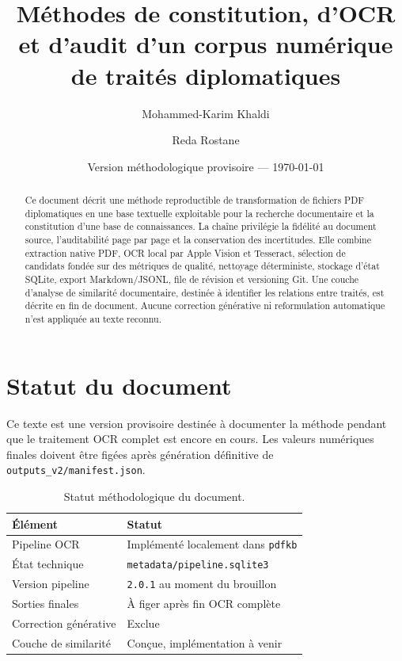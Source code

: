 \documentclass[11pt,a4paper]{article}
\title{Méthodes de constitution, d'OCR et d'audit d'un corpus numérique de traités diplomatiques}
\author{Mohammed-Karim Khaldi \and Reda Rostane}
\date{Version méthodologique provisoire --- \today}
\begin{document}
\maketitle

\begin{abstract}
Ce document décrit une méthode reproductible de transformation de fichiers PDF diplomatiques en une base textuelle exploitable pour la recherche documentaire et la constitution d'une base de connaissances. La chaîne privilégie la fidélité au document source, l'auditabilité page par page et la conservation des incertitudes. Elle combine extraction native PDF, OCR local par Apple Vision et Tesseract, sélection de candidats fondée sur des métriques de qualité, nettoyage déterministe, stockage d'état SQLite, export Markdown/JSONL, file de révision et versioning Git. Une couche d'analyse de similarité documentaire, destinée à identifier les relations entre traités, est décrite en fin de document. Aucune correction générative ni reformulation automatique n'est appliquée au texte reconnu.
\end{abstract}

\tableofcontents

\section{Statut du document}

Ce texte est une version provisoire destinée à documenter la méthode pendant que le traitement OCR complet est encore en cours. Les valeurs numériques finales doivent être figées après génération définitive de \texttt{outputs\_v2/manifest.json}.

\begin{table}[H]
\centering
\begin{tabular}{ll}
\toprule
Élément & Statut \\
\midrule
Pipeline OCR & Implémenté localement dans \texttt{pdfkb} \\
État technique & \texttt{metadata/pipeline.sqlite3} \\
Version pipeline & \texttt{2.0.1} au moment du brouillon \\
Sorties finales & À figer après fin OCR complète \\
Correction générative & Exclue \\
Couche de similarité & Conçue, implémentation à venir \\
\bottomrule
\end{tabular}
\caption{Statut méthodologique du document.}
\end{table}
\end{document}
